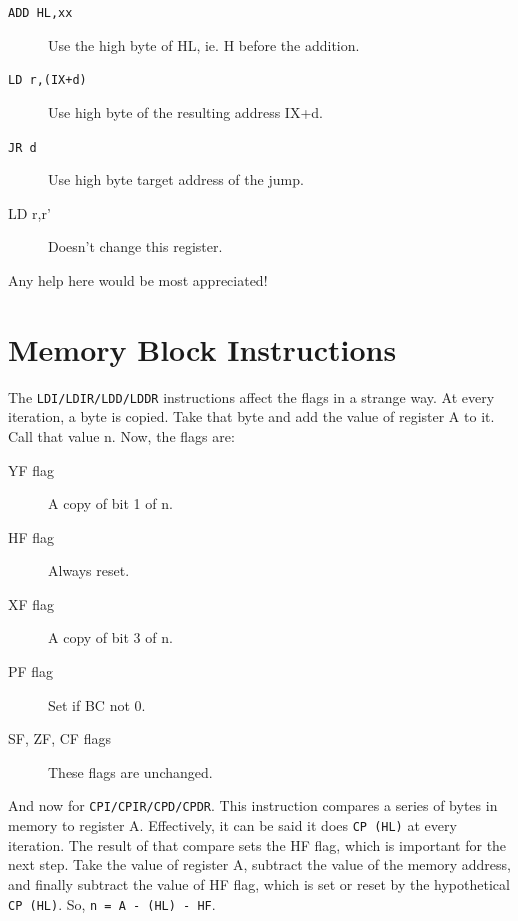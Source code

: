 \documentclass[oneside,a4paper]{book}
\begin{document}
\begin{description}

\item[{\tt ADD HL,xx}]
Use the high byte of HL, ie. H before the addition.

\item[{\tt LD r,(IX+d)}]
Use high byte of the resulting address IX+d.

\item[{\tt JR d}]
Use high byte target address of the jump.

\item[{LD r,r'}]
Doesn't change this register.

\end{description}

Any help here would be most appreciated!

\section{Memory Block Instructions \cite{mrison}}
\label{block_mem}

The {\tt LDI/LDIR/LDD/LDDR} instructions affect the flags in a strange way.
At every iteration, a byte is copied. Take that byte and add the value of 
register A to it. Call that value n. Now, the flags are:

\begin{description}
 
\item[YF flag]
  A copy of bit 1 of n.

\item[HF flag]
  Always reset.

\item[XF flag]
  A copy of bit 3 of n.

\item[PF flag]
  Set if BC not 0.

\item[SF, ZF, CF flags]
  These flags are unchanged.

\end{description}

And now for {\tt CPI/CPIR/CPD/CPDR}. This instruction compares a series of
bytes in memory to register A. Effectively, it can be said it does 
{\tt CP (HL)} at every iteration. The result of that compare sets the
HF flag, which is important for the next step. Take the value of register A,
subtract the value of the memory address, and finally subtract the value
of HF flag, which is set or reset by the hypothetical {\tt CP (HL)}. So,
{\tt n = A - (HL) - HF}.
\end{document}
